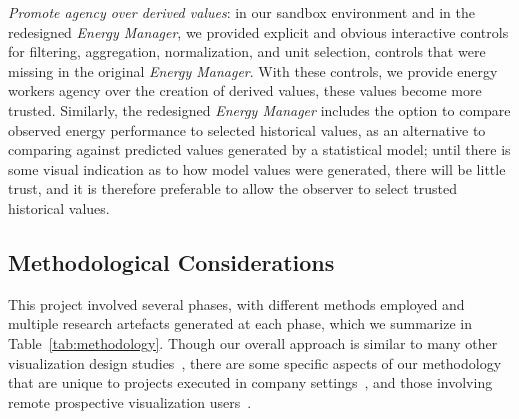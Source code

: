 \documentclass[journal]{vgtc}                %
\begin{document}
{\it Promote agency over derived values}: in our sandbox environment and in the redesigned {\it Energy Manager}, we provided explicit and obvious interactive controls for filtering, aggregation, normalization, and unit selection, controls that were missing in the original {\it Energy Manager}.
With these controls, we provide energy workers agency over the creation of derived values, these values become more trusted.
Similarly, the redesigned {\it Energy Manager} includes the option to compare observed energy performance to selected historical values, as an alternative to comparing against predicted values generated by a statistical model; until there is some visual indication as to how model values were generated, there will be little trust, and it is therefore preferable to allow the observer to select trusted historical values.


\subsection{Methodological Considerations}
\label{discussion-methodology}


This project involved several phases, with different methods employed and multiple research artefacts generated at each phase, which we summarize in Table~\ref{tab:methodology}.
Though our overall approach is similar to many other visualization design studies~\cite{McKenna2014,Sedlmair2012}, there are some specific aspects of our methodology that are unique to projects executed in company settings~\cite{Sedlmair2011}, and those involving remote prospective visualization users~\cite{Brehmer2014a}.
\end{document}
